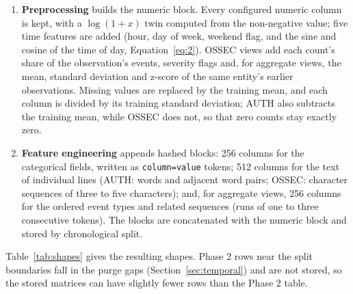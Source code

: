 \documentclass[11pt,a4paper]{article}
\begin{document}
\begin{enumerate}
\item \textbf{Preprocessing} builds the numeric block. Every configured numeric column is kept, with a \(\log(1+x)\) twin computed from the non-negative value; five time features are added (hour, day of week, weekend flag, and the sine and cosine of the time of day, Equation~\ref{eq:2}). OSSEC views add each count's share of the observation's events, severity flags and, for aggregate views, the mean, standard deviation and z-score of the same entity's earlier observations. Missing values are replaced by the training mean, and each column is divided by its training standard deviation; AUTH also subtracts the training mean, while OSSEC does not, so that zero counts stay exactly zero.
\item \textbf{Feature engineering} appends hashed blocks: 256 columns for the categorical fields, written as \nolinkurl{column=value} tokens; 512 columns for the text of individual lines (AUTH: words and adjacent word pairs; OSSEC: character sequences of three to five characters); and, for aggregate views, 256 columns for the ordered event types and related sequences (runs of one to three consecutive tokens). The blocks are concatenated with the numeric block and stored by chronological split.
\end{enumerate}

Table~\ref{tab:shapes} gives the resulting shapes. Phase 2 rows near the split boundaries fall in the purge gaps (Section~\ref{sec:temporal}) and are not stored, so the stored matrices can have slightly fewer rows than the Phase 2 table.
\end{document}
